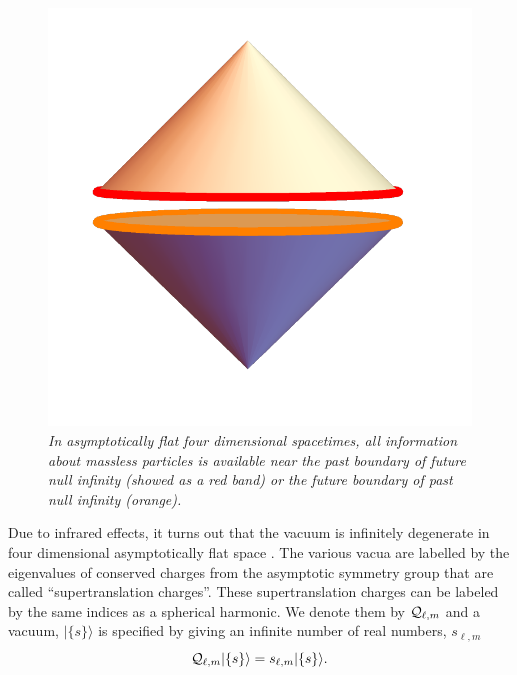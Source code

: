 \documentclass[12pt]{article}
\newcommand{\be}{\begin{equation}}
\newcommand{\ee}{\end{equation}}
\def\supcharge[#1]{\{#1\}}
\def\suptrans{{\cal Q}}
\begin{document}
\begin{figure}[!ht]
\begin{center}
\includegraphics[height=0.5\textheight]{bdrynull.pdf}
\caption{\em In asymptotically flat four dimensional spacetimes, all information about massless particles is available near the past boundary of future null infinity (showed as a red band) or the future boundary of past null infinity (orange). \label{allinfo}}
\end{center}
\end{figure}




Due to infrared effects, it turns out that the vacuum is infinitely degenerate in four dimensional asymptotically flat space \cite{Strominger:2013jfa}.  The various vacua are labelled by the eigenvalues of conserved charges from the asymptotic symmetry group \cite{Bondi:1962px} that are called ``supertranslation charges''. These supertranslation charges can be labeled by the same indices as a spherical harmonic. We denote them by $\suptrans_{\ell, m}$ and a vacuum, $|\supcharge[s] \rangle$  is specified by giving an infinite number of real numbers, $s_{\ell, m}$
\be
\suptrans_{\ell, m} |\supcharge[s] \rangle = s_{\ell, m} |\supcharge[s] \rangle.
\ee
\end{document}
